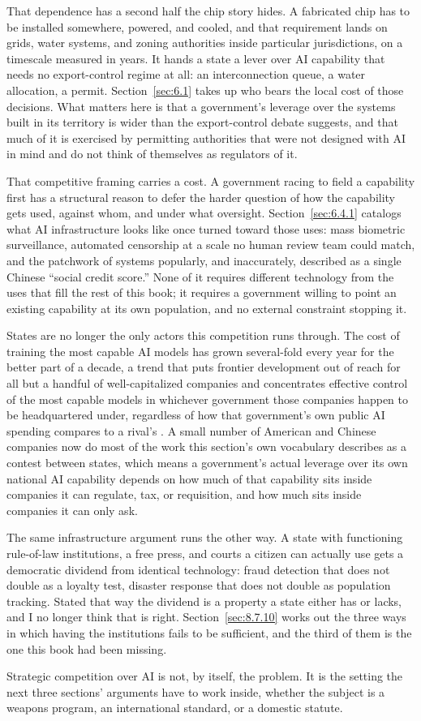 That dependence has a second half the chip story hides. A fabricated chip has to be installed somewhere, powered, and cooled, and that requirement lands on grids, water systems, and zoning authorities inside particular jurisdictions, on a timescale measured in years. It hands a state a lever over AI capability that needs no export-control regime at all: an interconnection queue, a water allocation, a permit. Section~\ref{sec:6.1} takes up who bears the local cost of those decisions. What matters here is that a government's leverage over the systems built in its territory is wider than the export-control debate suggests, and that much of it is exercised by permitting authorities that were not designed with AI in mind and do not think of themselves as regulators of it.

That competitive framing carries a cost. A government racing to field a capability first has a structural reason to defer the harder question of how the capability gets used, against whom, and under what oversight. Section~\ref{sec:6.4.1} catalogs what AI infrastructure looks like once turned toward those uses: mass biometric surveillance, automated censorship at a scale no human review team could match, and the patchwork of systems popularly, and inaccurately, described as a single Chinese “social credit score.” None of it requires different technology from the uses that fill the rest of this book; it requires a government willing to point an existing capability at its own population, and no external constraint stopping it.

States are no longer the only actors this competition runs through. The cost of training the most capable AI models has grown several-fold every year for the better part of a decade, a trend that puts frontier development out of reach for all but a handful of well-capitalized companies and concentrates effective control of the most capable models in whichever government those companies happen to be headquartered under, regardless of how that government's own public AI spending compares to a rival's \autocite{epoch2024costtrend}. A small number of American and Chinese companies now do most of the work this section's own vocabulary describes as a contest between states, which means a government's actual leverage over its own national AI capability depends on how much of that capability sits inside companies it can regulate, tax, or requisition, and how much sits inside companies it can only ask.

The same infrastructure argument runs the other way. A state with functioning rule-of-law institutions, a free press, and courts a citizen can actually use gets a democratic dividend from identical technology: fraud detection that does not double as a loyalty test, disaster response that does not double as population tracking. Stated that way the dividend is a property a state either has or lacks, and I no longer think that is right. Section~\ref{sec:8.7.10} works out the three ways in which having the institutions fails to be sufficient, and the third of them is the one this book had been missing.

Strategic competition over AI is not, by itself, the problem. It is the setting the next three sections' arguments have to work inside, whether the subject is a weapons program, an international standard, or a domestic statute.
